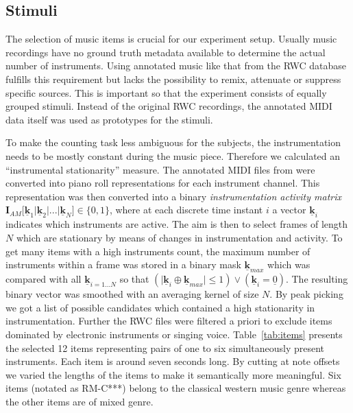 \subsection{Stimuli}

The selection of music items is crucial for our experiment setup. Usually music recordings have no ground truth metadata available to determine the actual number of instruments. Using annotated music like that from the RWC database \cite{rwc} fulfills this requirement but lacks the possibility to remix, attenuate or suppress specific sources. This is important so that the experiment consists of equally grouped stimuli. Instead of the original RWC recordings, the annotated MIDI data itself was used as prototypes for the stimuli.

To make the counting task less ambiguous for the subjects, the instrumentation needs to be mostly constant during the music piece. Therefore we calculated an ``instrumental stationarity'' measure. The annotated MIDI files from \cite{rwc} were converted into piano roll representations for each instrument channel. This representation was then converted into a binary \emph{instrumentation activity matrix} $\mathbf{I}_{AM}\lbrack \mathbf{\underline{k}}_1 \vert \mathbf{\underline{k}}_2 \vert  ... \vert \mathbf{\underline{k}}_N \rbrack \in \{0,1\}$, where at each discrete time instant $i$ a vector $\mathbf{\underline{k}}_i$ indicates which instruments are active. The aim is then to select frames of length $N$ which are stationary by means of changes in instrumentation and activity. To get many items with a high instruments count, the maximum number of instruments within a frame was stored in a binary mask $\mathbf{\underline{k}}_{max}$ which was compared with all $\mathbf{\underline{k}}_{i=1...N}$ so that $(\vert\mathbf{\underline{k}}_{i} \oplus \mathbf{\underline{k}}_{max}\vert \leq 1) \lor (\mathbf{\underline{k}}_{i} = \underline{0})$. The resulting binary vector was smoothed with an averaging kernel of size $N$. By peak picking we got a list of possible candidates which contained a high stationarity in instrumentation.
Further the RWC files were filtered a priori to exclude items dominated by electronic instruments or singing voice. Table~\ref{tab:items} presents the selected 12 items representing pairs of one to six simultaneously present instruments. Each item is around seven seconds long. By cutting at note offsets we varied the lengths of the items to make it semantically more meaningful. Six items (notated as RM-C***) belong to the classical western music genre whereas the other items are of mixed genre.

